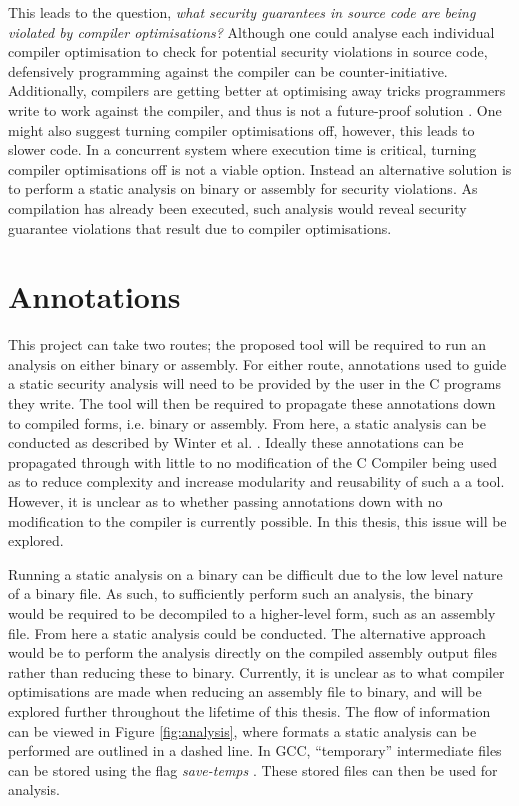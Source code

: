 \documentclass[twocolumn]{article}
\begin{document}
This leads to the question, \textit{what security guarantees in source code are being violated by compiler optimisations?} Although one could analyse each individual compiler optimisation to check for potential security violations in source code, defensively programming against the compiler can be counter-initiative. Additionally, compilers are getting better at optimising away tricks programmers write to work against the compiler, and thus is not a future-proof solution \cite{simon2018you}. One might also suggest turning compiler optimisations off, however, this leads to slower code. In a concurrent system where execution time is critical, turning compiler optimisations off is not a viable option. Instead an alternative solution is to perform a static analysis on binary or assembly for security violations. As compilation has already been executed, such analysis would reveal security guarantee violations that result due to compiler optimisations.

\section{Annotations}
This project can take two routes; the proposed tool will be required to run an analysis on either binary or assembly. For either route, annotations used to guide a static security analysis will need to be provided by the user in the C programs they write. The tool will then be required to propagate these annotations down to compiled forms, i.e. binary or assembly. From here, a static analysis can be conducted as described by Winter et al. \cite{winter2020information}. Ideally these annotations can be propagated through with little to no modification of the C Compiler being used as to reduce complexity and increase modularity and reusability of such a a tool. However, it is unclear as to whether passing annotations down with no modification to the compiler is currently possible. In this thesis, this issue will be explored.

Running a static analysis on a binary can be difficult due to the low level nature of a binary file. As such, to sufficiently perform such an analysis, the binary would be required to be decompiled to a higher-level form, such as an assembly file. From here a static analysis could be conducted. The alternative approach would be to perform the analysis directly on the compiled assembly output files rather than reducing these to binary. Currently, it is unclear as to what compiler optimisations are made when reducing an assembly file to binary, and will be explored further throughout the lifetime of this thesis. The flow of information can be viewed in Figure \ref{fig:analysis}, where formats a static analysis can be performed are outlined in a dashed line. In GCC, ``temporary'' intermediate files can be stored using the flag \textit{save-temps} \cite{gccdevoptions}. These stored files can then be used for analysis.
\end{document}

